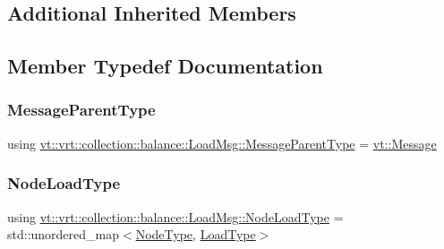\subsection*{Additional Inherited Members}


\subsection{Member Typedef Documentation}
\mbox{\label{structvt_1_1vrt_1_1collection_1_1balance_1_1_load_msg_a922095d2c2ceb7f192523defa012ca6d}} 
\subsubsection{\texorpdfstring{Message\+Parent\+Type}{MessageParentType}}
{\footnotesize\ttfamily using \hyperlink{structvt_1_1vrt_1_1collection_1_1balance_1_1_load_msg_a922095d2c2ceb7f192523defa012ca6d}{vt\+::vrt\+::collection\+::balance\+::\+Load\+Msg\+::\+Message\+Parent\+Type} =  \hyperlink{namespacevt_a3a3ddfef40b4c90915fa43cdd5f129ea}{vt\+::\+Message}}

\mbox{\label{structvt_1_1vrt_1_1collection_1_1balance_1_1_load_msg_a573cc4f6cf58c3160e94a6351a3912d2}} 
\subsubsection{\texorpdfstring{Node\+Load\+Type}{NodeLoadType}}
{\footnotesize\ttfamily using \hyperlink{structvt_1_1vrt_1_1collection_1_1balance_1_1_load_msg_a573cc4f6cf58c3160e94a6351a3912d2}{vt\+::vrt\+::collection\+::balance\+::\+Load\+Msg\+::\+Node\+Load\+Type} =  std\+::unordered\+\_\+map$<$\hyperlink{namespacevt_a866da9d0efc19c0a1ce79e9e492f47e2}{Node\+Type}, \hyperlink{namespacevt_a8fb51741340b87d7aaee0bef60e9896b}{Load\+Type}$>$}




